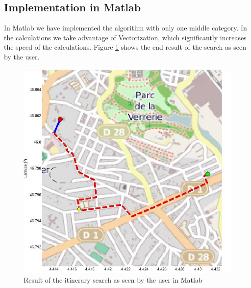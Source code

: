 \subsection{Implementation in Matlab}
In Matlab we have implemented the algorithm with only one middle category. In the calculations we take advantage of Vectorization, which significantly increases the speed of the calculations. Figure \ref{fig:ite_result_matlab} shows the end result of the search as seen by the user.   
\begin{figure}[h]
\centering
\includegraphics[width=0.6\linewidth]{../pictures/search_ite_matlab.jpg}
\caption{Result of the itinerary search as seen by the user in Matlab}
\label{fig:ite_result_matlab}
\end{figure}